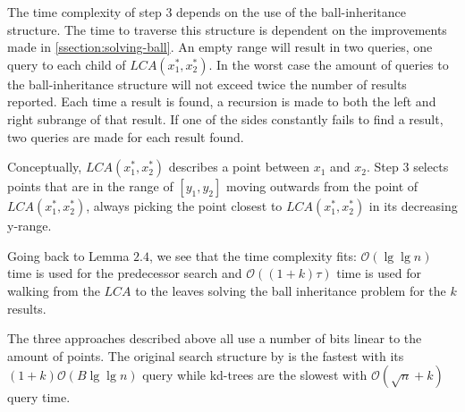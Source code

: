 
The time complexity of step $3$ depends on the use of the ball-inheritance structure. The time to traverse this structure is dependent on the improvements made in \ref{ssection:solving-ball}. An empty range will result in two queries, one query to each child of $LCA(x^*_1, x^*_2)$. In the worst case the amount of queries to the ball-inheritance structure will not exceed twice the number of results reported. Each time a result is found, a recursion is made to both the left and right subrange of that result. If one of the sides constantly fails to find a result, two queries are made for each result found. 

Conceptually, $LCA(x^*_1, x^*_2)$ describes a point between $x_1$ and $x_2$. Step $3$ selects points that are in the range of $[y_1, y_2]$ moving outwards from the point of $LCA(x^*_1, x^*_2)$, always picking the point closest to $LCA(x^*_1, x^*_2)$ in its decreasing y-range. 

Going back to Lemma $2.4$, we see that the time complexity fits: $\mathcal{O}(\lg \lg n)$ time is used for the predecessor search and $\mathcal{O}((1+k)\tau)$ time is used for walking from the $LCA$ to the leaves solving the ball inheritance problem for the $k$ results.

The three approaches described above all use a number of bits linear to the amount of points. The original search structure by \citet{chanetal} is the fastest with its $(1+k)\mathcal{O}(B\lg \lg n)$ query while kd-trees are the slowest with $\mathcal{O}(\sqrt{n} + k)$ query time.




